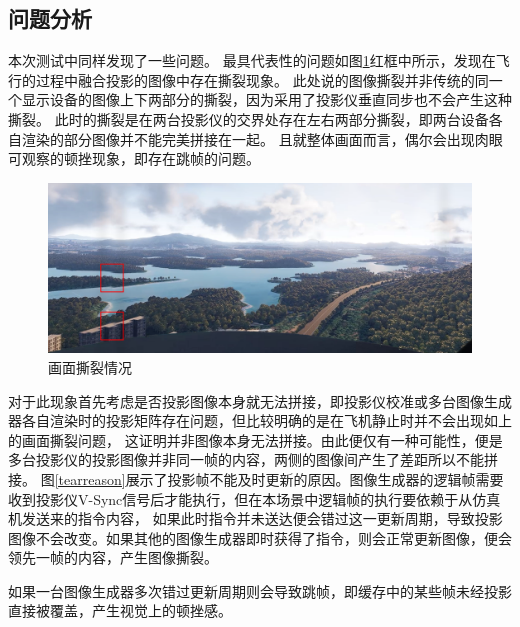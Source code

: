 \subsection{问题分析}
本次测试中同样发现了一些问题。
最具代表性的问题如图\ref{tear}红框中所示，发现在飞行的过程中融合投影的图像中存在撕裂现象。
此处说的图像撕裂并非传统的同一个显示设备的图像上下两部分的撕裂，因为采用了投影仪垂直同步也不会产生这种撕裂。
此时的撕裂是在两台投影仪的交界处存在左右两部分撕裂，即两台设备各自渲染的部分图像并不能完美拼接在一起。
且就整体画面而言，偶尔会出现肉眼可观察的顿挫现象，即存在跳帧的问题。
\begin{figure}[h!]
    \begin{center}
        \includegraphics[width=\textwidth]{pictures/tearmark.png}
        \caption{画面撕裂情况}
        \label{tear}
    \end{center}
\end{figure}
\par
对于此现象首先考虑是否投影图像本身就无法拼接，即投影仪校准或多台图像生成器各自渲染时的投影矩阵存在问题，但比较明确的是在飞机静止时并不会出现如上的画面撕裂问题，
这证明并非图像本身无法拼接。由此便仅有一种可能性，便是多台投影仪的投影图像并非同一帧的内容，两侧的图像间产生了差距所以不能拼接。
图\ref{tearreason}展示了投影帧不能及时更新的原因。图像生成器的逻辑帧需要收到投影仪V-Sync信号后才能执行，但在本场景中逻辑帧的执行要依赖于从仿真机发送来的指令内容，
如果此时指令并未送达便会错过这一更新周期，导致投影图像不会改变。如果其他的图像生成器即时获得了指令，则会正常更新图像，便会领先一帧的内容，产生图像撕裂。
\par
如果一台图像生成器多次错过更新周期则会导致跳帧，即缓存中的某些帧未经投影直接被覆盖，产生视觉上的顿挫感。
